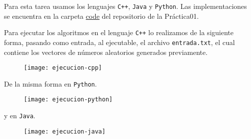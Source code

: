 Para esta tarea usamos los lenguajes \verb!C++!, \verb!Java! y \verb!Python!. Las implementaciones se encuentra en la carpeta \href{https://github.com/syordya/CSUNSA-EDA/tree/master/Practica01/code}{code} del repositorio de la Práctica01.


Para ejecutar los algoritmos en el lenguaje \verb!C++! lo realizamos de la siguiente forma, pasando como entrada, al ejecutable, el archivo \verb!entrada.txt!, el cual contiene los vectores de números aleatorios generados previamente.%
\begin{figure}[H]
  \centering
  \texttt{[image: ejecucion-cpp]}
  \label{fig:ejecucion-cpp}
\end{figure}

De la misma forma en \verb!Python!.%
\begin{figure}[H]
  \centering
  \texttt{[image: ejecucion-python]}
  \label{fig:ejecucion-python}
\end{figure}

y en \verb!Java!.%
\begin{figure}[H]
  \centering
  \texttt{[image: ejecucion-java]}
  \label{fig:ejecucion-java}
\end{figure}

\iffalse
Como se muestra en la figuras \ref{fig:act-1_a} y \ref{fig:act-1_b}.

\begin{figure}[H]

\centering

\begin{minipage}{0.75\textwidth}
  \centering
  \texttt{[image: ejecucion-java]}
  \caption{blablablabalbalabla.}
  \label{fig:act-1_a}
\end{minipage}\hfill

\begin{minipage}{0.75\textwidth}
  \centering
  \texttt{[image: ejecucion-java]}
  \caption{blablablslablala}
  \label{fig:act-1_b}
\end{minipage}

\end{figure}

Como se muestra en la figura \ref{fig:act-3}
\begin{figure}[H]
  \centering
  \texttt{[image: act-3]}
  \caption{Tabla de subneteo para la red 192.168.100.0.}
  \label{fig:act-3}
\end{figure}
\fi